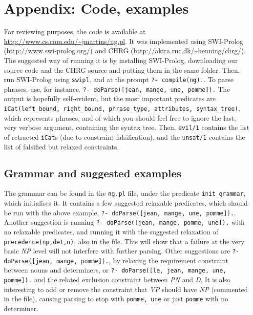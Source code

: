 \documentclass{llncs}
\begin{document}
 


%
%


\newpage
\appendix
\section{Appendix: Code, examples}
For reviewing purposes, the code is available at \url{http://www.cs.cmu.edu/~jmartins/ng.pl}. It was implemented using SWI-Prolog (\url{http://www.swi-prolog.org/}) and CHRG (\url{http://akira.ruc.dk/~henning/chrg/}).
The suggested way of running it is by installing SWI-Prolog, downloading our source code and the CHRG source and putting them in the same folder. Then, run SWI-Prolog using \texttt{swipl}, and at the prompt \texttt{?- compile(ng).}. To parse phrases, use, for instance, \texttt{?- doParse([jean, mange, une, pomme]).}
The output is hopefully self-evident, but the most important predicates are\\
\texttt{iCat(left\_bound, right\_bound, phrase\_type, attributes, syntax\_tree)},\\
which represents phrases, and of which you should feel free to ignore the last, very verbose argument, containing the syntax tree. Then, \texttt{evil/1} contains the list of retracted \texttt{iCat}s (due to constraint falsification), and the \texttt{unsat/1} contains the list of falsified but relaxed constraints.
\subsection{Grammar and suggested examples}
The grammar can be found in the \texttt{ng.pl} file, under the predicate \texttt{init\_grammar}, which initialises it. It contains a few suggested relaxable predicates, which should be run with the above example, \texttt{?- doParse([jean, mange, une, pomme]).}.
Another suggestion is running \texttt{?- doParse([jean, mange, pomme, une]).} with no relaxable predicates, and running it with the suggested relaxation of 
\texttt{precedence(np,det,n)}, also in the file. This will show that a failure at the very basic \textit{NP} level will not interfere with further parsing.
Other suggestions are \texttt{?- doParse([jean, mange, pomme]).}, by relaxing the requirement constraint between nouns and determiners, or \texttt{?- doParse([le, jean, mange, une, pomme]).} and the related exclusion constraint between \textit{PN} and \textit{D}.
It is also interesting to add or remove the constraint that \textit{VP} should have \textit{NP} (commented in the file), causing parsing to stop with \texttt{pomme, une} or just \texttt{pomme} with no determiner.
\end{document}
